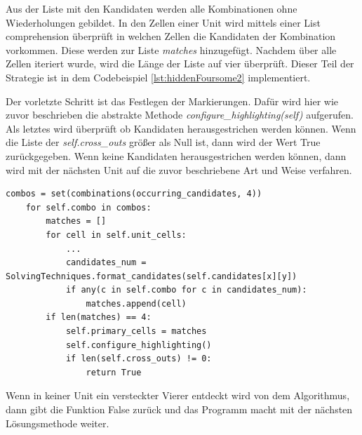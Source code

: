 Aus der Liste mit den Kandidaten werden alle Kombinationen ohne Wiederholungen gebildet. In den Zellen einer Unit wird mittels einer List comprehension überprüft in welchen Zellen die Kandidaten der Kombination vorkommen. Diese werden zur Liste \textit{matches} hinzugefügt. Nachdem über alle Zellen iteriert wurde, wird die Länge der Liste auf vier überprüft. Dieser Teil der Strategie ist in dem Codebeispiel \ref{lst:hiddenFoursome2} implementiert. 

Der vorletzte Schritt ist das Festlegen der Markierungen. Dafür wird hier wie zuvor beschrieben die abstrakte Methode \textit{configure\_highlighting(self)} aufgerufen. Als letztes wird überprüft ob Kandidaten herausgestrichen werden können. Wenn die Liste der \textit{self.cross\_outs} größer als Null ist, dann wird der Wert True zurückgegeben. Wenn keine Kandidaten herausgestrichen werden können, dann wird mit der nächsten Unit auf die zuvor beschriebene Art und Weise verfahren.

\begin{lstlisting}[caption={Erster Teil der Strategie Versteckter Vierer}, label={lst:hiddenFoursome2}]
	combos = set(combinations(occurring_candidates, 4))
	for self.combo in combos:
		matches = []
		for cell in self.unit_cells:
			...
			candidates_num = SolvingTechniques.format_candidates(self.candidates[x][y])
			if any(c in self.combo for c in candidates_num):
				matches.append(cell)
		if len(matches) == 4:
			self.primary_cells = matches
			self.configure_highlighting()
			if len(self.cross_outs) != 0:
				return True
\end{lstlisting}

Wenn in keiner Unit ein versteckter Vierer entdeckt wird von dem Algorithmus, dann gibt die Funktion False zurück und das Programm macht mit der nächsten Lösungsmethode weiter.